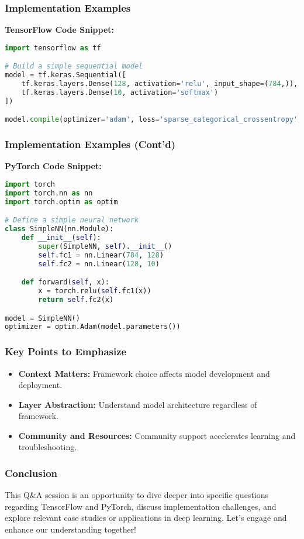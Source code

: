 \documentclass[aspectratio=169]{beamer}
\begin{document}
\begin{frame}[fragile]
    \frametitle{Implementation Examples}
    \textbf{TensorFlow Code Snippet:}
    \begin{lstlisting}[language=python]
import tensorflow as tf

# Build a simple sequential model
model = tf.keras.Sequential([
    tf.keras.layers.Dense(128, activation='relu', input_shape=(784,)),
    tf.keras.layers.Dense(10, activation='softmax')
])

model.compile(optimizer='adam', loss='sparse_categorical_crossentropy', metrics=['accuracy'])
    \end{lstlisting}
\end{frame}

\begin{frame}[fragile]
    \frametitle{Implementation Examples (Cont'd)}
    \textbf{PyTorch Code Snippet:}
    \begin{lstlisting}[language=python]
import torch
import torch.nn as nn
import torch.optim as optim

# Define a simple neural network
class SimpleNN(nn.Module):
    def __init__(self):
        super(SimpleNN, self).__init__()
        self.fc1 = nn.Linear(784, 128)
        self.fc2 = nn.Linear(128, 10)

    def forward(self, x):
        x = torch.relu(self.fc1(x))
        return self.fc2(x)

model = SimpleNN()
optimizer = optim.Adam(model.parameters())
    \end{lstlisting}
\end{frame}

\begin{frame}
    \frametitle{Key Points to Emphasize}
    \begin{itemize}
        \item \textbf{Context Matters:} Framework choice affects model development and deployment.
        \item \textbf{Layer Abstraction:} Understand model architecture regardless of framework.
        \item \textbf{Community and Resources:} Community support accelerates learning and troubleshooting.
    \end{itemize}
\end{frame}

\begin{frame}
    \frametitle{Conclusion}
    This Q\&A session is an opportunity to dive deeper into specific questions regarding TensorFlow and PyTorch, discuss implementation challenges, and explore relevant case studies or applications in deep learning. Let's engage and enhance our understanding together!
\end{frame}
\end{document}
